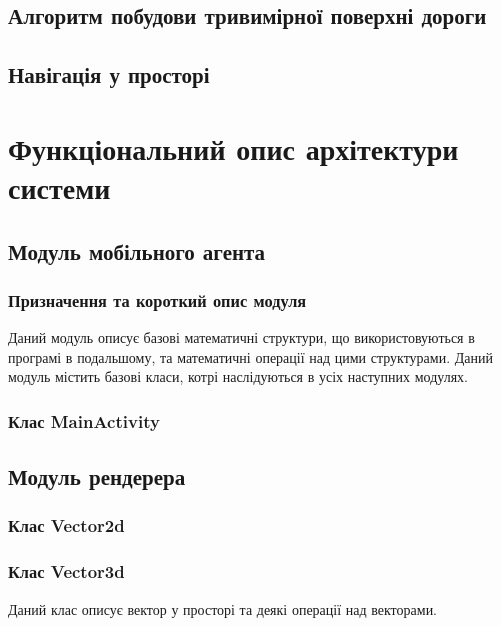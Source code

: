 \documentclass[simple,a4paper,14pt,ukrainian,utf8]{eskdtext}
\begin{document}
	\subsection{Алгоритм побудови тривимірної поверхні дороги}
	
	\subsection{Навігація у просторі}
       
\newpage \section{Функціональний опис архітектури системи}

    \subsection{Модуль мобільного агента}

        \subsubsection{Призначення та короткий опис модуля}

            Даний модуль описує базові математичні структури, що використовуються в програмі в подальшому, та математичні операції над цими структурами. Даний модуль містить базові класи, котрі наслідуються в усіх наступних модулях.

        \subsubsection{Клас MainActivity}
        
     \subsection{Модуль рендерера}
     
     	\subsubsection{Клас Vector2d}
     	
    	\subsubsection{Клас Vector3d}

            Даний клас описує вектор у просторі та деякі операції над векторами.
\end{document}
